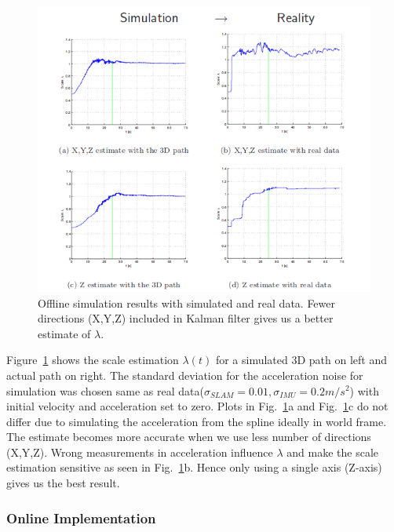 \begin{figure}
  \includegraphics[width=\textwidth]{./figures/ekfTest.png}
\caption{Offline simulation results with simulated and real data. Fewer directions (X,Y,Z) included in Kalman filter gives us a better estimate of $\lambda$.~\cite{nutzi2011fusion}}
\label{fig:ekf1}       %
\end{figure}

Figure~\ref{fig:ekf1} shows the scale estimation $\lambda(t)$ for a simulated 3D path on left and actual path on right. The standard deviation for the acceleration noise for simulation was chosen same as real data($\sigma_{SLAM} = 0.01, \sigma_{IMU} = 0.2 m/s^2$) with initial velocity and acceleration set to zero. Plots in Fig.~\ref{fig:ekf1}a and Fig.~\ref{fig:ekf1}c do not differ due to simulating the acceleration from the spline ideally in world frame. The estimate becomes more accurate when we use less number of directions (X,Y,Z).  Wrong measurements in acceleration influence $\lambda$ and make the scale estimation sensitive as seen in Fig.~\ref{fig:ekf1}b. Hence only using a single axis (Z-axis) gives us the best result. 


\subsubsection{Online Implementation}

